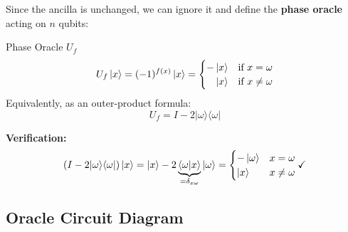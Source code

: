 \documentclass[12pt,a4paper]{article}
\newcommand{\proj}[1]{\vert#1\rangle\langle#1\vert}
\newcommand{\ip}[2]{\langle#1\vert#2\rangle}
\begin{document}
Since the ancilla is unchanged, we can ignore it and define the \textbf{phase oracle} acting on $n$ qubits:

\begin{defbox}{Phase Oracle $U_f$}
\[
  U_f\ket{x} = (-1)^{f(x)}\ket{x} =
  \begin{cases}
    -\ket{x} & \text{if } x = \omega\\
    \phantom{-}\ket{x} & \text{if } x \neq \omega
  \end{cases}
\]
Equivalently, as an outer-product formula:
\[
  \boxed{U_f = I - 2\proj{\omega}}
\]
\end{defbox}

\textbf{Verification:}
\[
  (I - 2\proj{\omega})\ket{x} = \ket{x} - 2\underbrace{\ip{\omega}{x}}_{=\delta_{x\omega}}\ket{\omega}
  = \begin{cases} -\ket{\omega} & x=\omega\\ \ket{x} & x\neq\omega \end{cases}\checkmark
\]

\subsection{Oracle Circuit Diagram}
\end{document}
